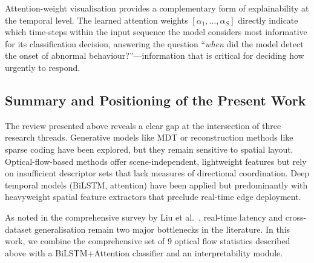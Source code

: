 Attention-weight visualisation provides a complementary form of explainability at the temporal level. The learned attention weights $[\alpha_1, \ldots, \alpha_S]$ directly indicate which time-steps within the input sequence the model considers most informative for its classification decision, answering the question ``\textit{when} did the model detect the onset of abnormal behaviour?''---information that is critical for deciding how urgently to respond.

\subsection{Summary and Positioning of the Present Work}

The review presented above reveals a clear gap at the intersection of three research threads. Generative models like MDT \cite{mahadevan2010anomaly} or reconstruction methods like sparse coding \cite{lu2013abnormal} have been explored, but they remain sensitive to spatial layout. Optical-flow-based methods offer scene-independent, lightweight features but rely on insufficient descriptor sets that lack measures of directional coordination. Deep temporal models (BiLSTM, attention) have been applied but predominantly with heavyweight spatial feature extractors that preclude real-time edge deployment.

As noted in the comprehensive survey by Liu et al.\ \cite{liu2024survey}, real-time latency and cross-dataset generalisation remain two major bottlenecks in the literature. In this work, we combine the comprehensive set of 9 optical flow statistics described above with a BiLSTM+Attention classifier and an interpretability module.

